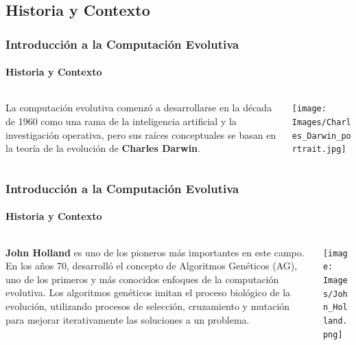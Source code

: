 \documentclass[
	11pt, %
]{beamer}
\begin{document}
\subsection{Historia y Contexto}
\begin{frame}
	\frametitle{Introducción a la Computación Evolutiva}
	\framesubtitle{Historia y Contexto}
	\begin{columns}[c] %
		\begin{column}{0.45\textwidth} %
                La computación evolutiva comenzó a desarrollarse en la década de 1960 como una rama de la inteligencia artificial y la investigación operativa, pero sus raíces conceptuales se basan en la teoría de la evolución de \textbf{Charles Darwin}.
		\end{column}
		\begin{column}{0.5\textwidth} %
			\texttt{[image: Images/Charles\_Darwin\_portrait.jpg]}
		\end{column}
	\end{columns}
\end{frame}

\begin{frame}
	\frametitle{Introducción a la Computación Evolutiva}
	\framesubtitle{Historia y Contexto}
	\begin{columns}[c] %
		\begin{column}{0.45\textwidth} %
                \textbf{John Holland} es uno de los pioneros más importantes en este campo. En los años 70, desarrolló el concepto de Algoritmos Genéticos (AG), uno de los primeros y más conocidos enfoques de la computación evolutiva. Los algoritmos genéticos imitan el proceso biológico de la evolución, utilizando procesos de selección, cruzamiento y mutación para mejorar iterativamente las soluciones a un problema.
		\end{column}
		\begin{column}{0.5\textwidth} %
			\texttt{[image: Images/John\_Holland.png]}
		\end{column}
	\end{columns}
\end{frame}

\end{document}
